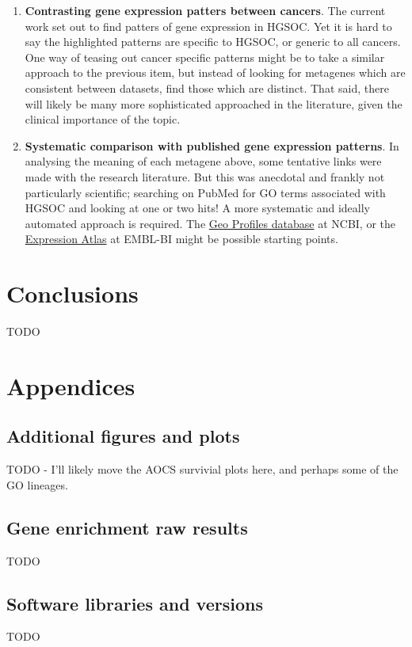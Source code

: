 \documentclass[draft, tikz, 12pt,a4paper,oneside,fleqn]{article}
\begin{document}
\begin{enumerate}
\item
{\bf Contrasting gene expression patters between cancers}.  The current work set out to find patters of gene expression in HGSOC.  Yet it is hard to say the highlighted patterns are specific to HGSOC, or generic to all cancers.  One way of teasing out cancer specific patterns might be to take a similar approach to the previous item, but instead of looking for metagenes which are consistent between datasets, find those which are distinct.  That said, there will likely be many more sophisticated approached in the literature, given the clinical importance of the topic.
\item
{\bf Systematic comparison with published gene expression patterns}.  In analysing the meaning of each metagene above, some tentative links were made with the research literature.   But this was anecdotal and frankly not particularly scientific; searching on PubMed for GO terms associated with HGSOC and looking at one or two hits!  A more systematic and ideally automated approach is required.  The \href{https://www.ncbi.nlm.nih.gov/geoprofiles}{Geo Profiles database} at NCBI, or the \href{https://www.ebi.ac.uk/gxa/home}{Expression Atlas} at EMBL-BI might be possible starting points.

\end{enumerate}


\section{Conclusions}
TODO




\section{Appendices}
\subsection{Additional figures and plots}
TODO - I'll likely move the AOCS survivial plots here, and perhaps some of the GO lineages.
\subsection{Gene enrichment raw results}
\label{tab-ica-4-of-5-enrichment-table}
TODO
\subsection{Software libraries and versions}
TODO
\label{sec-software-versions}
\end{document}
